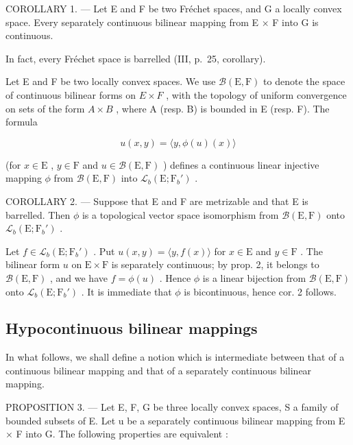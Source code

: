 COROLLARY 1. --- Let E and F be two Fréchet spaces, and G a locally convex space. Every separately continuous bilinear mapping from E × F into G is continuous.

In fact, every Fréchet space is barrelled (III, p.~25, corollary).

Let E and F be two locally convex spaces. We use \(\mathcal{B}(\mathrm{E},\mathrm{F})\) to denote the space of continuous bilinear forms on \(E \times F\) , with the topology of uniform convergence on sets of the form \(A \times B\) , where A (resp. B) is bounded in E (resp. F). The formula

\[
u (x, y) = \langle y, \phi (u) (x) \rangle
\]

(for \(x \in \mathrm{E}\) , \(y \in \mathrm{F}\) and \(u \in \mathcal{B}(\mathrm{E}, \mathrm{F})\) ) defines a continuous linear injective mapping \(\phi\) from \(\mathcal{B}(\mathrm{E}, \mathrm{F})\) into \(\mathcal{L}_b(\mathrm{E}; \mathrm{F}_b')\) .

COROLLARY 2. --- Suppose that E and F are metrizable and that E is barrelled. Then \(\phi\) is a topological vector space isomorphism from \(\mathcal{B}(\mathrm{E},\mathrm{F})\) onto \(\mathcal{L}_b(\mathrm{E};\mathrm{F}_b')\) .

Let \(f \in \mathcal{L}_b(\mathrm{E}; \mathrm{F}_b')\) . Put \(u(x, y) = \langle y, f(x) \rangle\) for \(x \in \mathrm{E}\) and \(y \in \mathrm{F}\) . The bilinear form \(u\) on \(\mathrm{E} \times \mathrm{F}\) is separately continuous; by prop. 2, it belongs to \(\mathcal{B}(\mathrm{E}, \mathrm{F})\) , and we have \(f = \phi(u)\) . Hence \(\phi\) is a linear bijection from \(\mathcal{B}(\mathrm{E}, \mathrm{F})\) onto \(\mathcal{L}_b(\mathrm{E}; \mathrm{F}_b')\) . It is immediate that \(\phi\) is bicontinuous, hence cor. 2 follows.

\subsection{Hypocontinuous bilinear mappings}

In what follows, we shall define a notion which is intermediate between that of a continuous bilinear mapping and that of a separately continuous bilinear mapping.

PROPOSITION 3. --- Let E, F, G be three locally convex spaces, S a family of bounded subsets of E. Let u be a separately continuous bilinear mapping from E × F into G. The following properties are equivalent :

